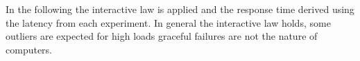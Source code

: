         In the following the interactive law is applied and the response time derived using the latency from each
        experiment. In general the interactive law holds, some outliers are expected for high loads graceful failures
        are not the nature of computers.

        \begin{figure}
            \vspace*{-.5\baselineskip}
\end{figure}
